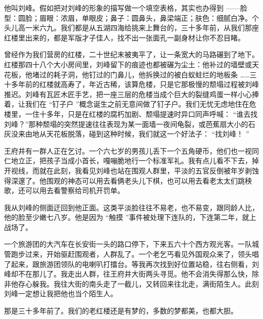 \documentclass[12pt,twoside,openany]{book}
\begin{document}
他叫刘峰。假如把对刘峰的形象的描写做一个填空表格，其实也办得到 ——脸型：圆脸；眉眼：浓眉，单眼皮；鼻子：圆鼻头，鼻梁端正；肤色：细腻白净。个头儿高一米六九。我们都是从五湖四海给挑来上舞台的，三十多年前，从我们那座红楼里出来的，都是军版才子佳人，找不出一张面孔一副身材让你不忍目睹。

曾经作为我们营房的红楼，二十世纪末被夷平了，让一条宽大的马路碾到了地下。红楼那四十八个大小房间里，刘峰留下的痕迹也都被碾为尘土：他补过的墙壁或天花板，他堵过的耗子洞，他钉过的门鼻儿，他拆换过的被白蚁蛀烂的地板条 ……三十多年前的红楼就高寿了，年近古稀，该算危楼，只是它那极慢的颓塌过程被刘峰推迟。刘峰有瓦匠木匠手艺，把一座三层的危楼当成个巨大的裂缝鸡蛋一样小心捧着，让我们在 “钉子户 ”概念诞生之前无意间做了钉子户。我们无忧无虑地住在危楼里，一住十多年，只是在红楼的腐朽加剧、颓塌提速时异口同声呼喊： “谁去找刘峰？”那种颓塌的突然提速往往表现为某一面墙一夜间龟裂，或芭蕉扇大小的石灰没来由地从天花板脱落，碰到这种时候，我们就这一个好法子： “找刘峰！ ”

王府井有一群人正在乞讨。一个六七岁的男孩儿丢下一个五角硬币，他们也一视同仁地立正，把孩子当成小首长，嘎嘣脆地行一个标准军礼。我有点儿看不下去，掉开视线，而就在此刻，我看见刘峰也站在围观人群里，平淡的五官反倒被年岁剥蚀得深邃了。他围观的神态可以用去看俩老头儿下棋，也可以用去看老太太们跳秧歌，还可以用去看警察给司机开罚单。

我从刘峰的侧面迂回到他正面。这类平淡脸往往不易老，也不易变，跟同龄人比，他的脸至少嫩七八岁。他是因为 “触摸 ”事件被处理下连队的，下连第二年，就上战场了。

一个旅游团的大汽车在长安街一头的路口停下，下来五六十个西方观光客。一队城管跑步过来，开始驱赶围观者，人群乱了。一个老乞丐看见外国观众来了，领头唱了起来，跟旅游团领队的电喇叭打擂台。等我再次找到好位置站稳，往右侧看，刘峰却不在那儿了。我走出人群，往王府井大街两头寻觅。他不会消失得那么快，除非他存心躲我。我往大街的南头走了一截儿，又转回来往北走，满街陌生人。此刻刘峰一定想让我把他也当个陌生人。

那是三十多年前了。我们的老红楼还是有梦的，多数的梦都美，也都大胆。
\end{document}
